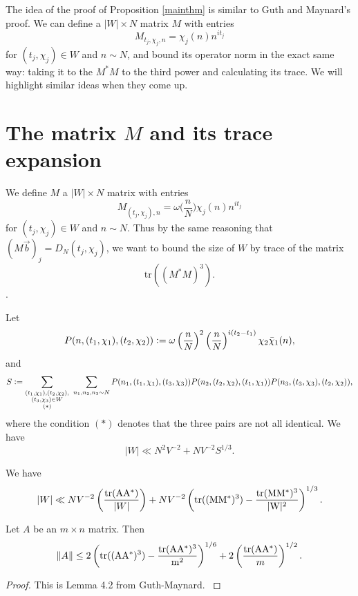 The idea of the proof of Proposition \ref{mainthm} is similar to Guth and Maynard's proof. We can define a $|W|\times N$ matrix $M$ with entries
\[
    M_{t_j,\chi_j,n} = \chi_j(n)n^{it_j}
\]
for $(t_j,\chi_j)\in W$ and $n\sim N$, and bound its operator norm in the exact same way: taking it to the $M^*M$ to the third power and calculating its trace. We will highlight similar ideas when they come up.

\section{The matrix $M$ and its trace expansion}
We define $M$ a $|W |\times N$ matrix with entries
\[
    M_{(t_j,\chi_j),n} = \omega\Big(\frac{n}{N}\Big)\chi_j(n)n^{it_j}
\]
for $(t_j,\chi_j)\in W$ and $n\sim N$.
Thus by the same reasoning that $(M\vec{b})_j=D_N(t_j,\chi_j)$,
we want to bound the size of $W$ by trace of the matrix \[
\textrm{tr}((M^*M)^3).
\].
\begin{proposition} \label{Tracebound}
    Let \[
    P(n,(t_1,\chi_1),(t_2,\chi_2))\mathrel{\mathop:}= \omega\left(\frac{n}{N}\right)^2 \left(\frac{n}{N}\right)^{i(t_2-t_1)}\chi_2\bar{\chi}_1(n),
    \]
    and \[
    S \defeq \sum_{\substack{(t_1,\chi_1),(t_2,\chi_2),\\(t_3,\chi_3)\in W\\ (*)} }\ \sum_{n_1,n_2,n_3\sim N} 
    P(n_1,(t_1,\chi_1),(t_3,\chi_3))P(n_2,(t_2,\chi_2),(t_1,\chi_1))P(n_3,(t_3,\chi_3),(t_2,\chi_2)),
    \]
    where the condition $(*)$ denotes that the three pairs are not all identical.
    We have 
    \[
        |W|\ll N^2 V^{-2} + N V^{-2} S^{1/3}.
    \]
    
\end{proposition}


\begin{lemma}\label{trace formula}
    We have 
    \[
        |W|\ll N V^{-2}\left(\frac{\rm{tr}(AA^*)}{|W|}\right) + N V^{-2}\left(\rm{tr}((MM^*)^3)-\frac{\rm{tr}(MM^*)^3}{|W|^2}\right)^{1/3}.
    \]
\end{lemma}


\begin{lemma}\label{hilberttrace}
    Let $A$ be an $m\times n$ matrix. Then 
    \[\|A\| \leq 2\left(\rm{tr}((AA^*)^3)-\frac{\rm{tr}(AA^*)^3}{m^2}\right)^{1/6}+2\left(\frac{\rm{tr}(AA^*)}{m}\right)^{1/2}.
    \]
\end{lemma}
\begin{proof}
    This is Lemma 4.2 from Guth-Maynard. \cite{GM2024}
\end{proof}



